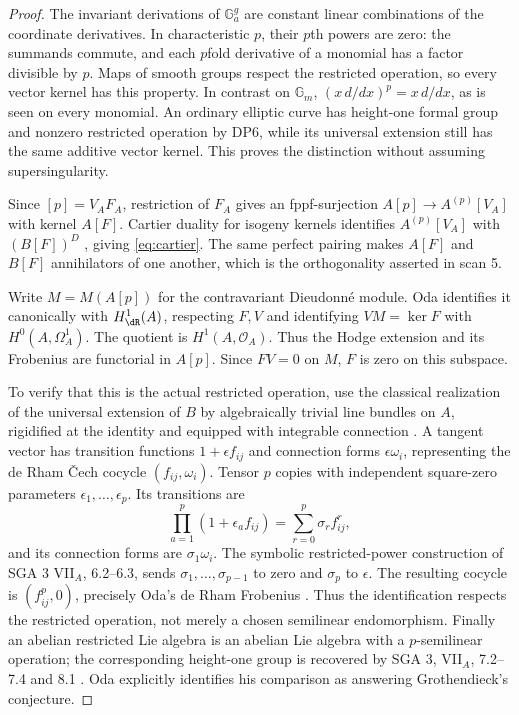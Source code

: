 \documentclass[11pt,a4paper]{article}
\theoremstyle{definition}\newtheorem{remark}[theorem]{Remark}
\newcommand{\Ga}{\mathbb G_a}\newcommand{\Gm}{\mathbb G_m}
\begin{document}
\begin{proof}
The invariant derivations of $\Ga^g$ are constant linear combinations of the coordinate derivatives. In characteristic $p$, their $p$th powers are zero: the summands commute, and each $p$fold derivative of a monomial has a factor divisible by $p$. Maps of smooth groups respect the restricted operation, so every vector kernel has this property. In contrast on $\Gm$, $(x\,d/dx)^p=x\,d/dx$, as is seen on every monomial. An ordinary elliptic curve has height-one formal group and nonzero restricted operation by DP6, while its universal extension still has the same additive vector kernel. This proves the distinction without assuming supersingularity.

Since $[p]=V_AF_A$, restriction of $F_A$ gives an fppf-surjection $A[p]\to A^{(p)}[V_A]$ with kernel $A[F]$. Cartier duality for isogeny kernels identifies $A^{(p)}[V_A]$ with $(B[F])^D$ \cite[Theorem 1.1 and Corollary 1.3, pp.~67--70]{Oda}, giving \eqref{eq:cartier}. The same perfect pairing makes $A[F]$ and $B[F]$ annihilators of one another, which is the orthogonality asserted in scan 5.

Write $M=M(A[p])$ for the contravariant Dieudonn\'e module. Oda \cite[Corollary 5.11, p.~131]{Oda} identifies it canonically with $H^1_\dR(A)$, respecting $F,V$ and identifying $VM=\ker F$ with $H^0(A,\Omega_A^1)$. The quotient is $H^1(A,\mathcal O_A)$. Thus the Hodge extension and its Frobenius are functorial in $A[p]$. Since $FV=0$ on $M$, $F$ is zero on this subspace.

To verify that this is the actual restricted operation, use the classical realization of the universal extension of $B$ by algebraically trivial line bundles on $A$, rigidified at the identity and equipped with integrable connection \cite[Chapter I, 2.6; Propositions 2.6.7, 3.2.3, 4.2.1; (4.6.3)]{MM}. A tangent vector has transition functions $1+\epsilon f_{ij}$ and connection forms $\epsilon\omega_i$, representing the de Rham \v Cech cocycle $(f_{ij},\omega_i)$. Tensor $p$ copies with independent square-zero parameters $\epsilon_1,\ldots,\epsilon_p$. Its transitions are
\[
 \prod_{a=1}^p(1+\epsilon_af_{ij})=\sum_{r=0}^p\sigma_rf_{ij}^r,
\]
and its connection forms are $\sigma_1\omega_i$. The symbolic restricted-power construction of SGA 3 VII$_A$, 6.2--6.3, sends $\sigma_1,\ldots,\sigma_{p-1}$ to zero and $\sigma_p$ to $\epsilon$. The resulting cocycle is $(f_{ij}^p,0)$, precisely Oda's de Rham Frobenius \cite[Definition 5.3]{Oda}. Thus the identification respects the restricted operation, not merely a chosen semilinear endomorphism. Finally an abelian restricted Lie algebra is an abelian Lie algebra with a $p$-semilinear operation; the corresponding height-one group is recovered by SGA 3, VII$_A$, 7.2--7.4 and 8.1 \cite{SGA3}. Oda explicitly identifies his comparison as answering Grothendieck's conjecture.
\end{proof}
\end{document}
